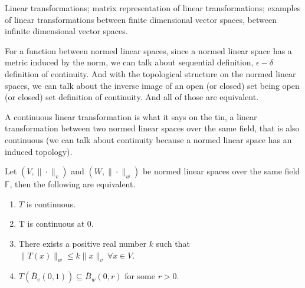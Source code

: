 \vspace{0.4cm}
\begin{recall}
    Linear transformations; matrix representation of linear transformations; examples of linear transformations between finite dimensional vector spaces, between infinite dimensional vector spaces.
\end{recall}
\vspace{0.4cm}
\begin{note}
    For a function between normed linear spaces, since a normed linear space has a metric induced by the norm, we can talk about sequential definition, $\epsilon-\delta$ definition of continuity. And with the topological structure on the normed linear spaces, we can talk about the inverse image of an open (or closed) set being open (or closed) set definition of continuity. And all of those are equivalent.
\end{note}
\vspace{0.4cm}
\begin{definition}
    A continuous linear transformation is what it says on the tin, a linear transformation between two normed linear spaces over the same field, that is also continuous (we can talk about continuity because a normed linear space has an induced topology).\\
\end{definition}
\vspace{0.4cm}
\begin{prop}
    \hypertarget{prop1}{
    Let $(V,\|\cdot\|_{v})$ and $(W,\|\cdot\|_{w})$ be normed linear spaces over the same field $\mathbb{F}$, then the following are equivalent.
    \begin{enumerate}[label=\roman*.]
        \item $T$ is continuous.
        \item T is continuous at $0$.
        \item There exists a positive real number $k$ such that $\|T(x)\|_{w}\leq k\|x\|_{v}~\forall x\in V$.
        \item $T\left(\overline{B}_{v}(0,1)\right)\subseteq\overline{B}_{w}(0,r)$ for some $r>0$.
\end{enumerate}}
\end{prop}
